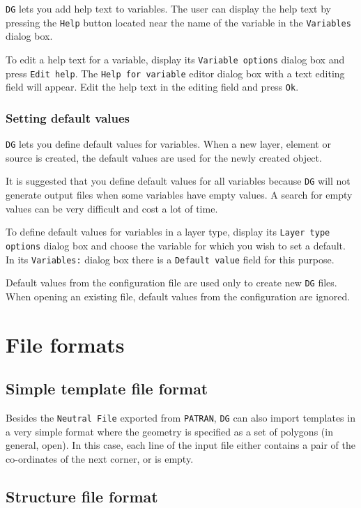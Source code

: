 \documentclass[a4paper,10pt]{report}
\begin{document}
{\tt DG} lets you add help text to variables. The user can display the help
text by pressing the {\tt Help} button located near the name of the variable in
the {\tt Variables} dialog box.

To edit a help text for a variable, display its {\tt Variable options}
dialog box and press {\tt Edit help}. The {\tt Help for variable} editor dialog box with a
text editing field will appear. Edit the help text in the editing
field and press {\tt Ok}.

\subsubsection{Setting default values}

{\tt DG} lets you define default values for variables. When a new layer,
element or source is created, the default values are used for the
newly created object.

It is suggested that you define default values for all variables
because {\tt DG} will not generate output files when some variables have
empty values. A search for empty values can be very difficult and cost
a lot of time.

To define default values for variables in a layer type, display its
{\tt Layer type options} dialog box and
choose the variable for which you wish to set a default.
In its {\tt Variables:} dialog box there is a
{\tt Default value} field for this purpose.

Default values from the configuration file are used only to create new
{\tt DG} files. When opening an existing file, default values from the
configuration are ignored.

\section{File formats}

\subsection{Simple template file format}

Besides the {\tt Neutral File} exported from {\tt PATRAN}, {\tt DG} can also import
templates in a very simple format where the geometry is specified as a
set of polygons (in general, open). In this case, each line of the
input file either contains a pair of the co-ordinates of the next
corner, or is empty.

\subsection{Structure file format}
\end{document}
